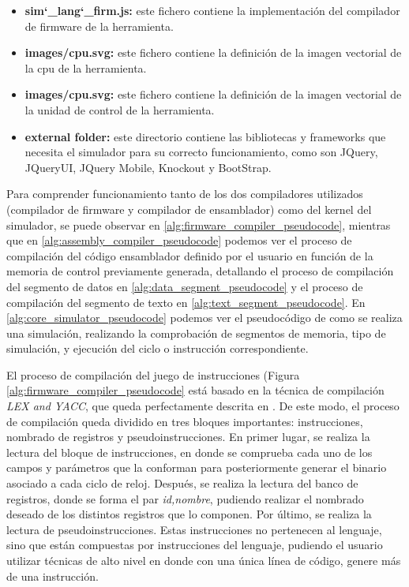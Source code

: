 \begin{itemize}
\item \textbf{sim\char`_lang\char`_firm.js: } este fichero contiene la implementación del compilador de firmware de la herramienta.

\item \textbf{images/cpu.svg: } este fichero contiene la definición de la imagen vectorial de la cpu de la herramienta.

\item \textbf{images/cpu.svg: } este fichero contiene la definición de la imagen vectorial de la unidad de control de la herramienta.

\item \textbf{external folder: } este directorio contiene las bibliotecas y frameworks que necesita el simulador para su correcto funcionamiento, como son JQuery, JQueryUI, JQuery Mobile, Knockout y BootStrap.

\end{itemize}

Para comprender funcionamiento tanto de los dos compiladores utilizados (compilador de firmware y compilador de ensamblador) como del kernel del simulador, se puede observar en \ref{alg:firmware_compiler_pseudocode}, mientras que en \ref{alg:assembly_compiler_pseudocode} podemos ver el proceso de compilación del código ensamblador definido por el usuario en función de la memoria de control previamente generada, detallando el proceso de compilación del segmento de datos en \ref{alg:data_segment_pseudocode} y el proceso de compilación del segmento de texto en \ref{alg:text_segment_pseudocode}. En \ref{alg:core_simulator_pseudocode} podemos ver el pseudocódigo de como se realiza una simulación, realizando la comprobación de segmentos de memoria, tipo de simulación, y ejecución del ciclo o instrucción correspondiente.

El proceso de compilación del juego de instrucciones (Figura \ref{alg:firmware_compiler_pseudocode} está basado en la técnica de compilación \textit{LEX and YACC}, que queda perfectamente descrita en \cite{bennett1996introduction}. De este modo, el proceso de compilación queda dividido en tres bloques importantes: instrucciones, nombrado de registros y pseudoinstrucciones. En primer lugar, se realiza la lectura del bloque de instrucciones, en donde se comprueba cada uno de los campos y parámetros que la conforman para posteriormente generar el binario asociado a cada ciclo de reloj. Después, se realiza la lectura del banco de registros, donde se forma el par \textit{id,nombre}, pudiendo realizar el nombrado deseado de los distintos registros que lo componen. Por último, se realiza la lectura de pseudoinstrucciones. Estas instrucciones no pertenecen al lenguaje, sino que están compuestas por instrucciones del lenguaje, pudiendo el usuario utilizar técnicas de alto nivel en donde con una única línea de código, genere más de una instrucción.

